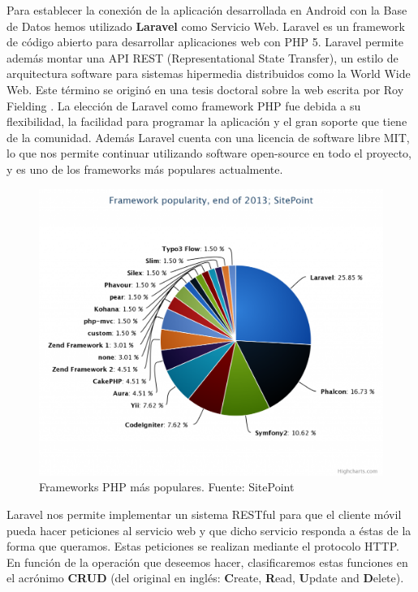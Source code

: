 Para establecer la conexión de la aplicación desarrollada en Android con la Base de Datos hemos utilizado \textbf{Laravel} como Servicio Web. Laravel \cite{ref:laravel} es un framework de código abierto para desarrollar aplicaciones web con PHP 5. Laravel permite además montar una API REST (Representational State Transfer), un estilo de arquitectura software para sistemas hipermedia distribuidos como la World Wide Web. Este término se originó en una tesis doctoral sobre la web escrita por Roy Fielding \cite{ref:RESTPhd}. La elección de Laravel como framework PHP fue debida a su flexibilidad, la facilidad para programar la aplicación y el gran soporte que tiene de la comunidad. Además Laravel cuenta con una licencia de software libre MIT, lo que nos permite continuar utilizando software open-source en todo el proyecto, y es uno de los frameworks más populares actualmente.

\begin{figure}[H]
\centering
\includegraphics[keepaspectratio, scale=0.30]{Media/Captures/frameworkPopularity.png}
\caption{Frameworks PHP más populares. Fuente: SitePoint}
\label{fig:laravel5popularity}
\end{figure}

Laravel nos permite implementar un sistema RESTful para que el cliente móvil pueda hacer peticiones al servicio web y que dicho servicio responda a éstas de la forma que queramos. Estas peticiones se realizan mediante el protocolo HTTP. En función de la operación que deseemos hacer, clasificaremos estas funciones en el acrónimo \textbf{CRUD} \cite{ref:CRUD} (del original en inglés: \textbf{C}reate, \textbf{R}ead, \textbf{U}pdate and \textbf{D}elete).

